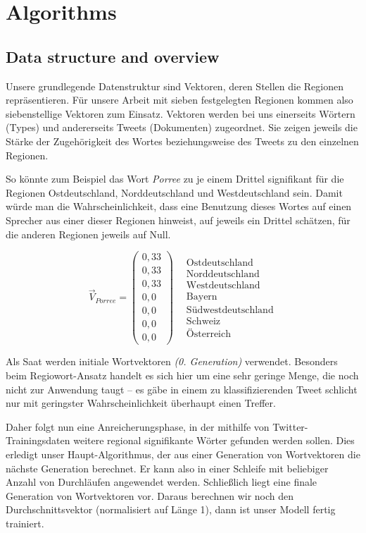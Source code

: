 \documentclass[../Main.tex]{subfiles}
\begin{document}
\section{Algorithms}
\subsection{Data structure and overview}
Unsere grundlegende Datenstruktur sind Vektoren, deren Stellen die Regionen repräsentieren. Für unsere Arbeit mit sieben festgelegten Regionen kommen also siebenstellige Vektoren zum Einsatz.
Vektoren werden bei uns einerseits Wörtern (Types) und andererseits Tweets (Dokumenten) zugeordnet. Sie zeigen jeweils die Stärke der Zugehörigkeit des Wortes beziehungsweise des Tweets zu den einzelnen Regionen.

So könnte zum Beispiel das Wort \textit{Porree} zu je einem Drittel signifikant für die Regionen Ostdeutschland, Norddeutschland und Westdeutschland sein. Damit würde man die Wahrscheinlichkeit, dass eine Benutzung dieses Wortes auf einen Sprecher aus einer dieser Regionen hinweist, auf jeweils ein Drittel schätzen, für die anderen Regionen jeweils auf Null.

$$\vec V_{Porree} = \begin{pmatrix} 0,33 \\ 0,33 \\ 0,33 \\ 0,0 \\ 0,0 \\ 0,0 \\ 0,0 \end{pmatrix} \ \ \ \ \begin{matrix} \text{Ostdeutschland} \\ \text{Norddeutschland} \\ \text{Westdeutschland} \\ \text{Bayern} \\ \text{Südwestdeutschland} \\ \text{Schweiz} \\ \text{Österreich} \end{matrix}$$

Als Saat werden initiale Wortvektoren \textit{(0. Generation)} verwendet. Besonders beim Regiowort-Ansatz handelt es sich hier um eine sehr geringe Menge, die noch nicht zur Anwendung taugt -- es gäbe in einem zu klassifizierenden Tweet schlicht nur mit geringster Wahrscheinlichkeit überhaupt einen Treffer.

Daher folgt nun eine Anreicherungsphase, in der mithilfe von Twitter-Trainingsdaten weitere regional signifikante Wörter gefunden werden sollen. Dies erledigt unser Haupt-Algorithmus, der aus einer Generation von Wortvektoren die nächste Generation berechnet. Er kann also in einer Schleife mit beliebiger Anzahl von Durchläufen angewendet werden. Schließlich liegt eine finale Generation von Wortvektoren vor. Daraus berechnen wir noch den Durchschnittsvektor (normalisiert auf Länge 1), dann ist unser Modell fertig trainiert.
\end{document}
